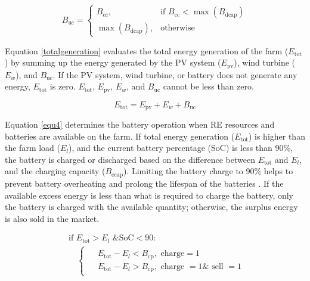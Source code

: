 \documentclass[preprint,12pt]{elsarticle}
\begin{document}
\begin{equation}
\label{usbalecapacity}
B_{\text{uc}} = 
\begin{cases} 
B_{\text{cc}}, & \text{if } B_{\text{cc}} < \max(B_{\text{dcap}}) \\
\max(B_{\text{dcap}}), & \text{otherwise}
\end{cases}
\end{equation}

Equation \ref{totalgeneration} evaluates the total energy generation of the farm ($E_{\text{tot}}$) by summing up the energy generated by the PV system ($E_{\text{pv}}$), wind turbine ($E_{w}$), and $B_{\text{uc}}$. If the PV system, wind turbine, or battery does not generate any energy, $E_{\text{tot}}$ is zero. $E_{\text{tot}}$, $E_{\text{pv}}$, $E_{w}$, and $B_{\text{uc}}$ cannot be less than zero.

\begin{equation}
\label{totalgeneration}
E_{\text{tot}} = E_{\text{pv}} + E_{w} + B_{\text{uc}}
\end{equation}

Equation \ref{equ4} determines the battery operation when RE resources and batteries are available on the farm. If total energy generation ($E_{\text{tot}}$) is higher than the farm load ($E_{l}$), and the current battery percentage ($\text{SoC}$) is less than 90\%, the battery is charged or discharged based on the difference between $E_{\text{tot}}$ and $E_{l}$, and the charging capacity ($B_{\text{ccap}}$). Limiting the battery charge to 90\% helps to prevent battery overheating and prolong the lifespan of the batteries \cite{saxena2016cycle}. If the available excess energy is less than what is required to charge the battery, only the battery is charged with the available quantity; otherwise, the surplus energy is also sold in the market.

\begin{equation}
\label{equ4}
\begin{aligned}
& \text{if } E_{\text{tot}} > E_{l} \text{ \& } \text{SoC} < 90: \\
& \quad 
\begin{cases}
\begin{aligned}
& E_{\text{tot}} - E_{l} < B_{\text{cp}}, \text{ charge}=1 \\
& E_{\text{tot}} - E_{l} > B_{\text{cp}}, \text{ charge } = 1 \& \text{ sell } = 1
\end{aligned}
\end{cases}
\end{aligned}
\end{equation}
\end{document}
